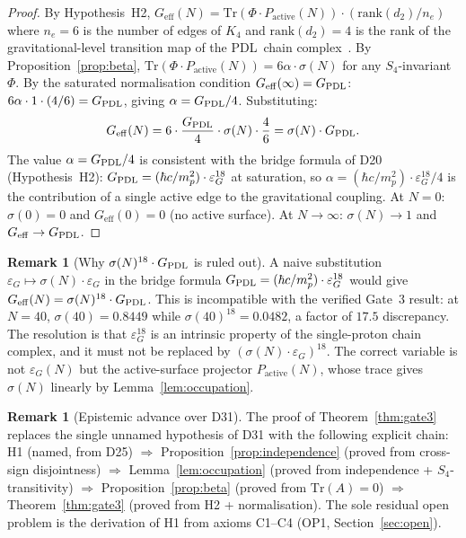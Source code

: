 \documentclass[11pt,a4paper]{article}
\theoremstyle{definition}
\newtheorem{remark}[theorem]{Remark}
\newcommand{\PDL}{\textnormal{PDL}}
\newcommand{\hb}{\hbar}
\newcommand{\GPDL}{G_{\PDL}}
\newcommand{\Geff}{G_{\mathrm{eff}}}
\newcommand{\sig}{\sigma}
\newcommand{\Kfour}{K_4}
\newcommand{\epsg}{\varepsilon_G}
\begin{document}
\begin{proof}
By Hypothesis~H2, $\Geff(N) = \mathrm{Tr}(\Phi\cdot P_{\mathrm{active}}(N))\cdot(\mathrm{rank}(d_2)/n_e)$ where $n_e = 6$ is the number of edges of $\Kfour$ and $\mathrm{rank}(d_2) = 4$ is the rank of the gravitational-level transition map of the \PDL\ chain complex~\cite{Topology_18_PDL_2026,PDL_D31_2026}. By Proposition~\ref{prop:beta}, $\mathrm{Tr}(\Phi\cdot P_{\mathrm{active}}(N)) = 6\alpha\cdot\sig(N)$ for any $S_4$-invariant~$\Phi$. By the saturated normalisation condition $\Geff(\infty) = \GPDL$: $6\alpha\cdot 1\cdot(4/6) = \GPDL$, giving $\alpha = \GPDL/4$. Substituting:
\begin{equation}
\Geff(N) = 6\cdot\frac{\GPDL}{4}\cdot\sig(N)\cdot\frac{4}{6} = \sig(N)\cdot\GPDL. \label{eq:gate3_proof}
\end{equation}
The value $\alpha = \GPDL/4$ is consistent with the bridge formula of D20 (Hypothesis~H2): $\GPDL = (\hb c/m_p^2)\cdot\epsg^{18}$ at saturation, so $\alpha = (\hb c/m_p^2)\cdot\epsg^{18}/4$ is the contribution of a single active edge to the gravitational coupling. At $N=0$: $\sig(0)=0$ and $\Geff(0)=0$ (no active surface). At $N\to\infty$: $\sig(N)\to 1$ and $\Geff\to\GPDL$.
\end{proof}

\begin{remark}[Why $\sig(N)^{18}\cdot\GPDL$ is ruled out]
\label{rem:power18}
A naive substitution $\epsg\mapsto\sig(N)\cdot\epsg$ in the bridge formula $\GPDL = (\hb c/m_p^2)\cdot\epsg^{18}$ would give $\Geff(N) = \sig(N)^{18}\cdot\GPDL$. This is incompatible with the verified Gate~3 result: at $N=40$, $\sig(40) = 0.8449$ while $\sig(40)^{18} = 0.0482$, a factor of $17.5$ discrepancy. The resolution is that $\epsg^{18}$ is an intrinsic property of the single-proton chain complex, and it must not be replaced by $(\sig(N)\cdot\epsg)^{18}$. The correct variable is not $\epsg(N)$ but the active-surface projector $P_{\mathrm{active}}(N)$, whose trace gives $\sig(N)$ linearly by Lemma~\ref{lem:occupation}.
\end{remark}

\begin{remark}[Epistemic advance over D31]
The proof of Theorem~\ref{thm:gate3} replaces the single unnamed hypothesis of D31 with the following explicit chain: H1 (named, from D25) $\Rightarrow$ Proposition~\ref{prop:independence} (proved from cross-sign disjointness) $\Rightarrow$ Lemma~\ref{lem:occupation} (proved from independence + $S_4$-transitivity) $\Rightarrow$ Proposition~\ref{prop:beta} (proved from $\mathrm{Tr}(A)=0$) $\Rightarrow$ Theorem~\ref{thm:gate3} (proved from H2 + normalisation). The sole residual open problem is the derivation of H1 from axioms C1--C4 (OP1, Section~\ref{sec:open}).
\end{remark}
\end{document}
